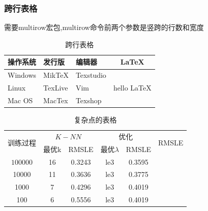 \documentclass[UTF8,a4paper,8pt,no-math]{article} %
\numberwithin{equation}{section} %
\begin{document}
\subsubsection{跨行表格}
需要multirow宏包,multirow命令前两个参数是竖跨的行数和宽度
\begin{table}[htbp]
	\caption{跨行表格}
	\center
	\begin{tabular}{lllc}
		\toprule
		操作系统 & 发行版  & 编辑器    & \LaTeX                            \\
		\midrule
		Windows  & MikTeX  & Texstudio & \multirow{3}{100pt}{hello \LaTeX} \\
		\cline{2-3} %
		Linux    & TexLive & Vim                                           \\
		Mac OS   & MacTex  & Texshop                                       \\
		\bottomrule
	\end{tabular}
\end{table}

\begin{table}
	\center
	\caption{复杂点的表格}
	\begin{tabular}{cccccc}
		\toprule
		\multirow{2}{*}{训练过程} & \multicolumn{2}{c}{$K-NN$} & \multicolumn{2}{c}{优化} & \multirow{2}{*}{RMSLE}                          \\
		\cmidrule(r){2-3} \cmidrule(r){4-5}
		                          & 最优k                      & RMSLE                    & 最优$ \lambda $        & RMSLE                  \\
		\midrule
		$100000$                  & 16                         & 0.3243                   & le3                    & 0.3595 & \XSolidBrush  \\
		10000                     & 11                         & 0.3636                   & le3                    & 0.3775 & \Checkmark    \\
		1000                      & 7                          & 0.4296                   & le3                    & 0.4019 & \SixStar      \\
		100                       & 6                          & 0.5556                   & le3                    & 0.4019 & \JackStarBold \\
		\bottomrule
	\end{tabular}

\end{table}

\cleardoublepage
\end{document}
